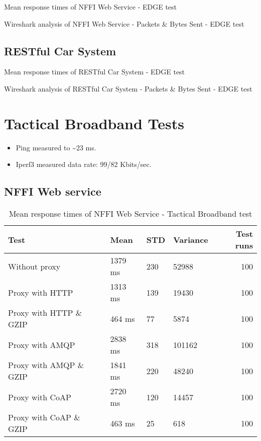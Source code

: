 \begin{appendices}
\begin{table}[H]

\caption{Mean response times of NFFI Web Service - EDGE test}
\end{table}

\begin{table}[H]

\caption{Wireshark analysis of NFFI Web Service - Packets \& Bytes Sent - EDGE test}
\end{table}

\subsection{RESTful Car System}

\begin{table}[H]

\caption{Mean response times of RESTful Car System - EDGE test}
\end{table}

\begin{table}[H]

\caption{Wireshark analysis of RESTful Car System - Packets \& Bytes Sent - EDGE test}
\end{table}


\section{Tactical Broadband Tests}

\begin{itemize}
	\item Ping measured to \textasciitilde 23 ms.
	\item Iperf3 measured data rate: 99/82 Kbits/sec.
\end{itemize}

\subsection{NFFI Web service}

\begin{table}[H]
\begin{tabular}{llllr}
\hline
 Test                   &   Mean &   STD &   Variance &   Test runs \\
\hline
  Without proxy & 1379 ms & 230 & 52988 & 100 \\
  Proxy with HTTP & 1313 ms & 139 & 19430 & 100 \\
  Proxy with HTTP \& GZIP & 464 ms & 77 & 5874 & 100 \\
  Proxy with AMQP & 2838 ms & 318 & 101162 & 100 \\
  Proxy with AMQP \& GZIP & 1841 ms & 220 & 48240 & 100\\
  Proxy with CoAP & 2720 ms & 120 & 14457 & 100 \\
  Proxy with CoAP \& GZIP & 463 ms & 25 & 618 & 100 \\
\end{tabular}
\caption{Mean response times of NFFI Web Service - Tactical Broadband test}
\end{table}


\end{appendices}
